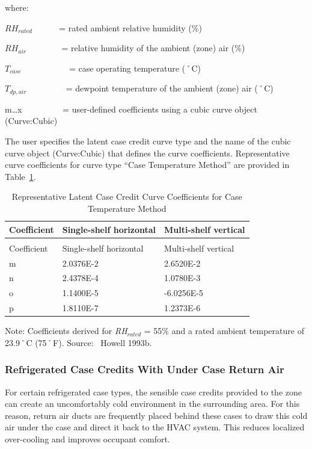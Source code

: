where:

\(R{H_{rated}}\) ~~~~~ = rated ambient relative humidity (\%)

\(R{H_{air}}\) ~~~~~~~ = relative humidity of the ambient (zone) air (\%)

\({T_{case}}\) ~~~~~~~~~~ = case operating temperature (˚C)

\({T_{dp,air}}\) ~~~~~~~~ = dewpoint temperature of the ambient (zone) air (˚C)

m\ldots{}x~~~~~~~~~ = user-defined coefficients using a cubic curve object (Curve:Cubic)

The user specifies the latent case credit curve type and the name of the cubic curve object (Curve:Cubic) that defines the curve coefficients. Representative curve coefficients for curve type ``Case Temperature Method'' are provided in Table~\ref{table:representative-latent-case-credit-curve}.

\begin{longtable}[c]{@{}lll@{}}
\caption{Representative Latent Case Credit Curve Coefficients for Case Temperature Method \label{table:representative-latent-case-credit-curve}} \tabularnewline
\toprule 
Coefficient & Single-shelf horizontal & Multi-shelf vertical \tabularnewline
\midrule
\endfirsthead

\caption[]{Representative Latent Case Credit Curve Coefficients for Case Temperature Method} \tabularnewline
\toprule 
Coefficient & Single-shelf horizontal & Multi-shelf vertical \tabularnewline
\midrule
\endhead

m & 2.0376E-2 & 2.6520E-2 \tabularnewline
n & 2.4378E-4 & 1.0780E-3 \tabularnewline
o & 1.1400E-5 & -6.0256E-5 \tabularnewline
p & 1.8110E-7 & 1.2373E-6 \tabularnewline
\bottomrule
\end{longtable}

Note: Coefficients derived for \emph{RH\(_{rated}\)} = 55\% and a rated ambient temperature of 23.9˚C (75˚F). Source:~ Howell 1993b.

\subsubsection{Refrigerated Case Credits With Under Case Return Air}\label{refrigerated-case-credits-with-under-case-return-air}

For certain refrigerated case types, the sensible case credits provided to the zone can create an uncomfortably cold environment in the surrounding area. For this reason, return air ducts are frequently placed behind these cases to draw this cold air under the case and direct it back to the HVAC system. This reduces localized over-cooling and improves occupant comfort.

